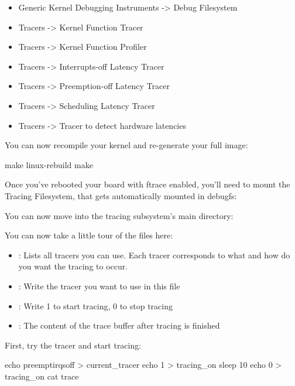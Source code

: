 \begin{itemize}
	\item Generic Kernel Debugging Instruments -> Debug Filesystem
	\item Tracers -> Kernel Function Tracer
	\item Tracers -> Kernel Function Profiler
	\item Tracers -> Interrupts-off Latency Tracer
	\item Tracers -> Preemption-off Latency Tracer
	\item Tracers -> Scheduling Latency Tracer
	\item Tracers -> Tracer to detect hardware latencies
\end{itemize}

You can now recompile your kernel and re-generate your full image:

\begin{bashinput}
make linux-rebuild
make
\end{bashinput}

Once you've rebooted your board with ftrace enabled, you'll need to mount the
Tracing Filesystem, that gets automatically mounted in debugfs:



You can now move into the tracing subsystem's main directory:


You can now take a little tour of the files here:

\begin{itemize}
	\item {}: Lists all tracers you can use. Each tracer
		corresponds to what and how do you want the tracing to occur.
	\item {}: Write the tracer you want to use in this file
	\item {}: Write 1 to start tracing, 0 to stop tracing
	\item {}: The content of the trace buffer after tracing is finished
\end{itemize}

First, try the  tracer and start tracing:

\begin{bashinput}
echo preemptirqsoff > current_tracer
echo 1 > tracing_on
sleep 10
echo 0 > tracing_on
cat trace
\end{bashinput}

